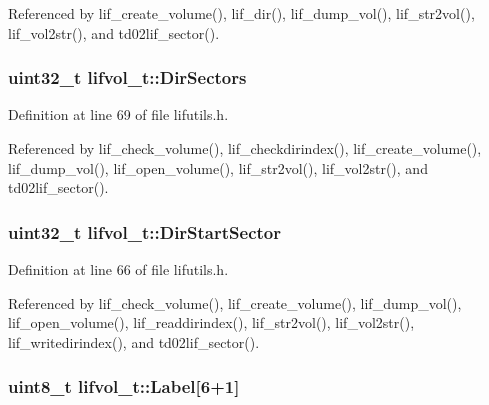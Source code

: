 Referenced by lif\+\_\+create\+\_\+volume(), lif\+\_\+dir(), lif\+\_\+dump\+\_\+vol(), lif\+\_\+str2vol(), lif\+\_\+vol2str(), and td02lif\+\_\+sector().

\subsubsection[{\texorpdfstring{Dir\+Sectors}{DirSectors}}]{\setlength{\rightskip}{0pt plus 5cm}uint32\+\_\+t lifvol\+\_\+t\+::\+Dir\+Sectors}\hypertarget{structlifvol__t_aceac3bc67cda1f79d91c002411e33897}{}\label{structlifvol__t_aceac3bc67cda1f79d91c002411e33897}


Definition at line 69 of file lifutils.\+h.



Referenced by lif\+\_\+check\+\_\+volume(), lif\+\_\+checkdirindex(), lif\+\_\+create\+\_\+volume(), lif\+\_\+dump\+\_\+vol(), lif\+\_\+open\+\_\+volume(), lif\+\_\+str2vol(), lif\+\_\+vol2str(), and td02lif\+\_\+sector().

\subsubsection[{\texorpdfstring{Dir\+Start\+Sector}{DirStartSector}}]{\setlength{\rightskip}{0pt plus 5cm}uint32\+\_\+t lifvol\+\_\+t\+::\+Dir\+Start\+Sector}\hypertarget{structlifvol__t_a89b86c990a7843cfa2addfff9a775137}{}\label{structlifvol__t_a89b86c990a7843cfa2addfff9a775137}


Definition at line 66 of file lifutils.\+h.



Referenced by lif\+\_\+check\+\_\+volume(), lif\+\_\+create\+\_\+volume(), lif\+\_\+dump\+\_\+vol(), lif\+\_\+open\+\_\+volume(), lif\+\_\+readdirindex(), lif\+\_\+str2vol(), lif\+\_\+vol2str(), lif\+\_\+writedirindex(), and td02lif\+\_\+sector().

\subsubsection[{\texorpdfstring{Label}{Label}}]{\setlength{\rightskip}{0pt plus 5cm}uint8\+\_\+t lifvol\+\_\+t\+::\+Label\mbox{[}6+1\mbox{]}}\hypertarget{structlifvol__t_abbccb2f637812a31d24aa1f6725194be}{}\label{structlifvol__t_abbccb2f637812a31d24aa1f6725194be}


